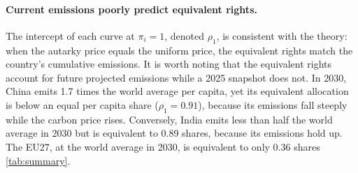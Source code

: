 \documentclass[12pt,english]{article}
\theoremstyle{remark}
\begin{document}

\paragraph{Current emissions poorly predict equivalent rights.} 
The intercept of each curve at $\pi_i=1$, denoted $\rho_1$, is consistent with the theory: when the autarky price equals the uniform price, the equivalent rights match the country's cumulative emissions. 
It is worth noting that the equivalent rights account for future projected emissions while a 2025 snapshot does not. 
In 2030, China emits 1.7 times the world average per capita, yet its equivalent allocation is below an equal per capita share ($\rho_1=0.91$), because its emissions fall steeply while the carbon price rises. Conversely, India emits less than half the world average in 2030 but is equivalent to 0.89 shares, because its emissions hold up. The EU27, at the world average in 2030, is equivalent to only 0.36 shares \ref{tab:summary}. %

\end{document}
